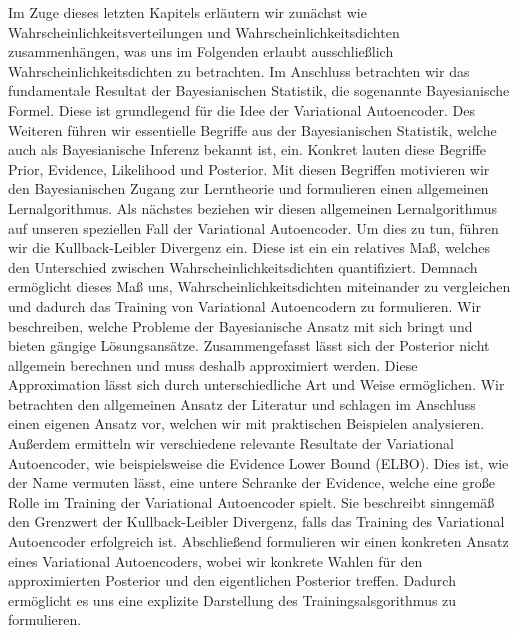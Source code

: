 \documentclass[11pt, twoside, a4paper]{book}
\theoremstyle{plain}
\theoremstyle{definition}
\theoremstyle{plain}
\begin{document}
Im Zuge dieses letzten Kapitels erläutern wir zunächst wie Wahrscheinlichkeitsverteilungen und Wahrscheinlichkeitsdichten zusammenhängen, was uns im Folgenden erlaubt ausschließlich Wahrscheinlichkeitsdichten zu betrachten. Im Anschluss betrachten wir das fundamentale Resultat der Bayesianischen Statistik, die sogenannte \glqq Bayesianische Formel\grqq{}. Diese ist grundlegend für die Idee der Variational Autoencoder. Des Weiteren führen wir essentielle Begriffe aus der Bayesianischen Statistik, welche auch als Bayesianische Inferenz bekannt ist, ein. Konkret lauten diese Begriffe \glqq Prior\grqq{}, \glqq Evidence\grqq{}, \glqq Likelihood\grqq{} und \glqq Posterior\grqq{}. Mit diesen Begriffen motivieren wir den Bayesianischen Zugang zur Lerntheorie und formulieren einen allgemeinen Lernalgorithmus. Als nächstes beziehen wir diesen allgemeinen Lernalgorithmus auf unseren speziellen Fall der Variational Autoencoder. Um dies zu tun, führen wir die Kullback-Leibler Divergenz ein. Diese ist ein ein relatives Maß, welches den Unterschied zwischen Wahrscheinlichkeitsdichten quantifiziert. Demnach ermöglicht dieses Maß uns, Wahrscheinlichkeitsdichten miteinander zu vergleichen und dadurch das Training von Variational Autoencodern zu formulieren. Wir beschreiben, welche Probleme der Bayesianische Ansatz mit sich bringt und bieten gängige Lösungsansätze. Zusammengefasst lässt sich der Posterior nicht allgemein berechnen und muss deshalb approximiert werden. Diese Approximation lässt sich durch unterschiedliche Art und Weise ermöglichen. Wir betrachten den allgemeinen Ansatz der Literatur und schlagen im Anschluss einen eigenen Ansatz vor, welchen wir mit praktischen Beispielen analysieren.
Außerdem ermitteln wir verschiedene relevante Resultate der Variational Autoencoder, wie beispielsweise die \glqq Evidence Lower Bound\grqq{} (ELBO). Dies ist, wie der Name vermuten lässt, eine untere Schranke der Evidence, welche eine große Rolle im Training der Variational Autoencoder spielt. Sie beschreibt sinngemäß den Grenzwert der Kullback-Leibler Divergenz, falls das Training des Variational Autoencoder erfolgreich ist. Abschließend formulieren wir einen konkreten Ansatz eines Variational Autoencoders, wobei wir konkrete Wahlen für den approximierten Posterior und den eigentlichen Posterior treffen. Dadurch ermöglicht es uns eine explizite Darstellung des Trainingsalsgorithmus zu formulieren.
\end{document}

